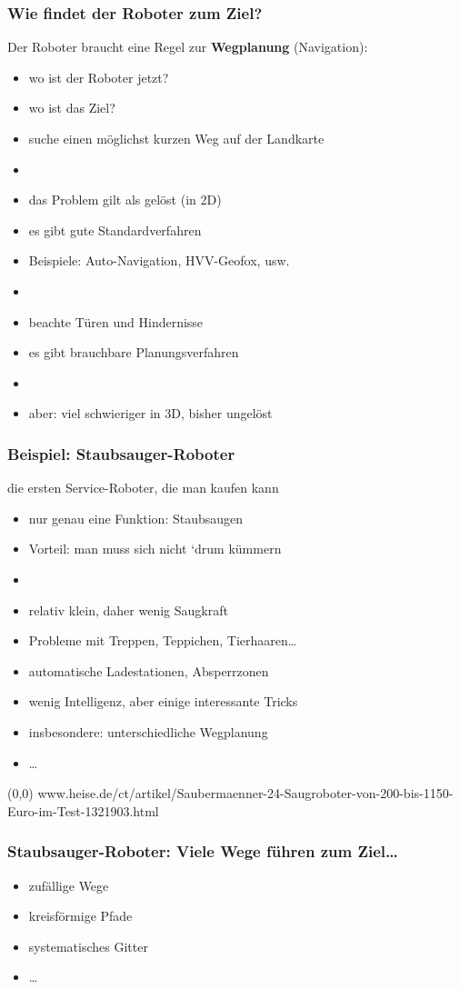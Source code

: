 \documentclass[t]{beamer}
\def\quelle#1{{\tiny \makebox(0,0){}\vfill\hfill #1}}
\def\ii{\item[]}
\begin{document}
\begin{frame}
\frametitle{Wie findet der Roboter zum Ziel?}
Der Roboter braucht eine Regel zur \textbf{Wegplanung} (Navigation):
\begin{itemize}
\item wo ist der Roboter jetzt?
\item wo ist das Ziel?
\item suche einen möglichst kurzen Weg auf der Landkarte
\ii
\item das Problem gilt als gelöst (in 2D)
\item es gibt gute Standardverfahren
\item Beispiele: Auto-Navigation, HVV-Geofox, usw.
\ii
\item beachte Türen und Hindernisse
\item es gibt brauchbare Planungsverfahren
\ii 
\item aber: viel schwieriger in 3D, bisher ungelöst
\end{itemize}
\end{frame}


\begin{frame}
\frametitle{Beispiel: Staubsauger-Roboter}
die ersten Service-Roboter, die man kaufen kann
\begin{itemize}
\item nur genau eine Funktion: Staubsaugen
\item Vorteil: man muss sich nicht `drum kümmern
\ii
\item relativ klein, daher wenig Saugkraft
\item Probleme mit Treppen, Teppichen, Tierhaaren\dots
\item automatische Ladestationen, Absperrzonen
\item wenig Intelligenz, aber einige interessante Tricks
\item insbesondere: unterschiedliche Wegplanung
\item \dots
\end{itemize}
\quelle{%
www.heise.de/ct/artikel/Saubermaenner-24-Saugroboter-von-200-bis-1150-Euro-im-Test-1321903.html}
\end{frame}


\begin{frame}
\frametitle{Staubsauger-Roboter: Viele Wege führen zum Ziel\dots}
\vspace*{-5mm}
\begin{itemize}
\item zufällige Wege
\item kreisförmige Pfade
\item systematisches Gitter
\item \dots
\end{itemize}
\end{frame}
\end{document}
